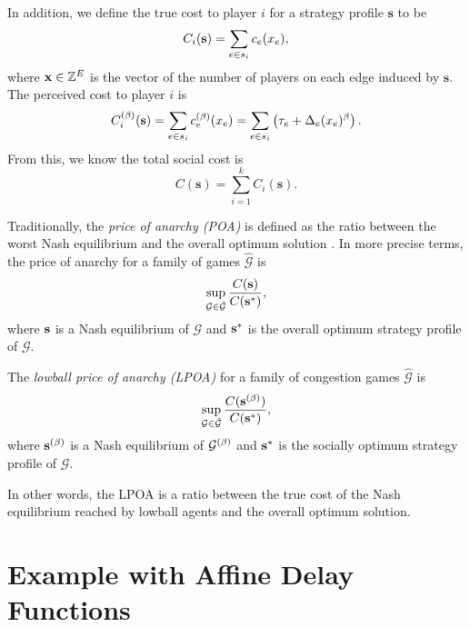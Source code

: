 \documentclass[twoside]{article}
\begin{document}
\begin{multicols}{2}
In addition, we define the true cost to player $i$ for a strategy profile
$\mathbf{s}$ to be
\[
  C_i(\mathbf{s}) = \sum\limits_{e \in s_i}c_e(x_e),
\]
where $\mathbf{x}
\in \mathbb{Z}^E$ is the vector of the number of players on each edge induced by
$\mathbf{s}$.  The perceived cost to player $i$ is
\[
  C^{(\beta)}_i(\mathbf{s}) = \sum\limits_{e \in s_i}c_e^{(\beta)}(x_e) = \sum\limits_{e \in
  s_i}\left(\tau_e + \Delta_e(x_e)^\beta\right).
\]
From this, we know the total social cost is
\[
  C(\mathbf{s}) = \sum_{i=1}^{k}C_i(\mathbf{s}).
\]
        
Traditionally, the \textit{price of anarchy (POA)} is defined as the ratio
between the worst Nash equilibrium and the overall optimum solution
\cite{Koutsoupias2009}.  In more precise terms, the price of anarchy for a
family of games $\hat{\mathcal{G}}$ is
\[
  \sup_{\mathcal{G} \in \hat{\mathcal{G}}} \frac{C(\mathbf{s})}{C(\mathbf{s}^*)},
\]
where $\mathbf{s}$ is a Nash equilibrium of $\mathcal{G}$ and $\mathbf{s}^*$ is the overall
optimum strategy profile of $\mathcal{G}$.

\begin{defn}
  The \textit{lowball price of anarchy (LPOA)} for a family of congestion games
  $\hat{\mathcal{G}}$ is
  \begin{equation}
    \sup_{\mathcal{G} \in \hat{\mathcal{G}}} \frac{C(\mathbf{s}^{(\beta)})}{C(\mathbf{s}^*)},
    \label{eq:lpoa}
  \end{equation}
  where $\mathbf{s}^{(\beta)}$ is a Nash equilibrium of $\mathcal{G}^{(\beta)}$ and $\mathbf{s}^*$ is the
  socially optimum strategy profile of $\mathcal{G}$.
\end{defn} In other words, the LPOA is a ratio between the true cost of the Nash
equilibrium reached by lowball agents and the overall optimum solution.

\section{Example with Affine Delay Functions}
\begin{figure}[H]
  \centering
  \begin{subfigure}[b]{\linewidth}
    \centering
\end{subfigure}
\end{figure}
\end{multicols}
\end{document}
